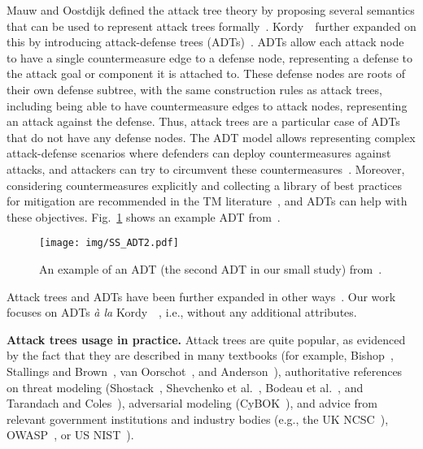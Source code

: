 Mauw and Oostdijk defined the attack tree theory by proposing several semantics that can be used to represent attack trees formally~\cite{mauwFoundationsAttackTrees2006}. Kordy~\etal\ further expanded on this by introducing attack-defense trees (ADTs)~\cite{kordyFoundationsAttackDefense2011}. ADTs allow each attack node to have a single countermeasure edge to a defense node, representing a defense to the attack goal or component it is attached to. These defense nodes are roots of their own defense subtree, with the same construction rules as attack trees, including being able to have countermeasure edges to attack nodes, representing an attack against the defense. Thus, attack trees are a particular case of ADTs that do not have any defense nodes. The ADT model allows representing complex attack-defense scenarios where defenders can deploy countermeasures against attacks, and attackers can try to circumvent these countermeasures~\cite{kordyFoundationsAttackDefense2011,kordyDAGBasedAttackDefense2013}. Moreover, considering countermeasures explicitly and  collecting a library of best practices for mitigation are recommended in the TM literature~\cite{dhillon2011developer,jawad2024m,trentinaglia2023eliciting}, and ADTs can help with these objectives.
 Fig.~\ref{img:ss-adt2} shows an example ADT from~\cite{sunCyberAttackRisksAnalysis2018}. 



\begin{figure}
\texttt{[image: img/SS\_ADT2.pdf]}
\caption{An example of an ADT (the second ADT in our small study) from~\cite{sunCyberAttackRisksAnalysis2018}.}
    \label{img:ss-adt2}
\end{figure}

Attack trees and ADTs have been further expanded in other ways~\cite{kordyADToolSecurityAnalysis2013,widel2019beyond,hongSurveyUsabilityPractical2017}. Our work focuses on ADTs 
\emph{{\`a} la} Kordy~\etal~\cite{kordyFoundationsAttackDefense2011}, i.e., without any additional attributes.

\textbf{Attack trees usage in practice.}
Attack trees are quite popular, as evidenced by the fact that they are described in many textbooks (for example, Bishop~\cite{bishop2019computer}, Stallings and Brown~\cite{stallings2018computer}, van Oorschot~\cite{van2020computer}, and Anderson~\cite{andersonSecurityEngineeringGuide2020}), authoritative references on threat modeling (Shostack~\cite{shostack2014threat}, Shevchenko et al.~\cite{shevchenko2018threat}, Bodeau et al.~\cite{mitre2018tm}, and Tarandach and Coles~\cite{tarandach2020threat}), adversarial modeling (CyBOK~\cite{stringhini2021adversarial}), and advice from relevant government institutions and industry bodies (e.g., the UK NCSC~\cite{ncsc2023attacktrees,ncsc2020telecom}), OWASP~\cite{owasp2024tm}, or US NIST~\cite{nist202180030}). 

